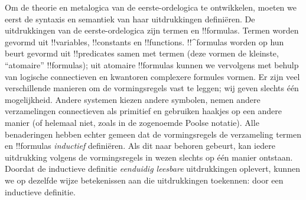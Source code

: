 \documentclass[openany]{memoir}
\begin{document}
\endgroup

\begingroup
\def\olfilename{OLP-0150}
\def\olfilepath{content/first-order-logic/syntax-and-semantics/}
\hypertarget{unit-OLP-0150}{}





Om de theorie en metalogica van de eerste-ordelogica te ontwikkelen,
moeten we eerst de syntaxis en semantiek van haar uitdrukkingen
definiëren. De uitdrukkingen van de eerste-ordelogica zijn termen en
!!{formula}s. Termen worden gevormd uit !!{variable}s, !!{constant}s en
!!{function}s. !!^{formula}s worden op hun beurt gevormd uit
!!{predicate}s samen met termen (deze vormen de kleinste, ``atomaire''
!!{formula}s); uit atomaire !!{formula}s kunnen we vervolgens met
behulp van logische connectieven en kwantoren complexere formules
vormen. Er zijn veel verschillende manieren om de vormingsregels vast
te leggen; wij geven slechts één mogelijkheid. Andere systemen kiezen
andere symbolen, nemen andere verzamelingen connectieven als primitief
en gebruiken haakjes op een andere manier (of helemaal niet, zoals in
de zogenoemde Poolse notatie). Alle benaderingen hebben echter gemeen
dat de vormingsregels de verzameling termen en !!{formula}s
\emph{inductief} definiëren. Als dit naar behoren gebeurt, kan iedere
uitdrukking volgens de vormingsregels in wezen slechts op één manier
ontstaan. Doordat de inductieve definitie \emph{eenduidig leesbare}
uitdrukkingen oplevert, kunnen we op dezelfde wijze betekenissen aan
die uitdrukkingen toekennen: door een inductieve definitie.
\endgroup

\begingroup
\def\olfilename{OLP-0151}
\def\olfilepath{content/first-order-logic/syntax-and-semantics/}
\hypertarget{unit-OLP-0151}{}
\end{document}
